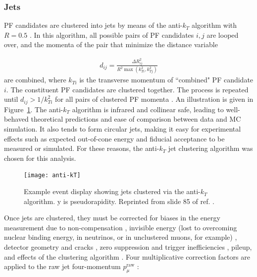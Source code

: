 \documentclass[dissertation.tex]{subfiles}
\begin{document}
\subsubsection{Jets}
\label{sec:Jets}

PF candidates are clustered into jets by means of the anti-$k_{T}$ algorithm with $R = 0.5$ \cite{AK5}.  In this algorithm, all possible pairs of PF candidates $i, j$ are looped over, and the momenta of the pair that minimize the distance variable

\begin{eqnarray}
d_{ij} = \frac{\Delta R_{ij}^{2}}{R^{2}\max(k_{Ti}^{2}, k_{Tj}^{2})}
\end{eqnarray}
%
are combined, where $k_{Ti}$ is the transverse momentum of ``combined" PF candidate $i$.  The constituent PF candidates are clustered together.  The process is repeated until $d_{ij} > 1/k_{Ti}^{2}$ for all pairs of clustered PF momenta \cite{Salam_talk}.  An illustration is given in Figure~\ref{fig:anti-kT}.  The anti-$k_{T}$ algorithm is infrared and collinear safe, leading to well-behaved theoretical predictions and ease of comparison between data and MC simulation.  It also tends to form circular jets, making it easy for experimental effects such as expected out-of-cone energy and fiducial acceptance to be measured or simulated.  For these reasons, the anti-$k_{T}$ jet clustering algorithm was chosen for this analysis.

\begin{figure}
	\centering
	\texttt{[image: anti-kT]}
	\caption{Example event display showing jets clustered via the anti-$k_{T}$ algorithm.  y is pseudorapidity.  Reprinted from slide 85 of ref. \cite{Salam_talk}.}
	\label{fig:anti-kT}
\end{figure}

Once jets are clustered, they must be corrected for biases in the energy measurement due to non-compensation \cite{Wigmans}, invisible energy (lost to overcoming nuclear binding energy, in neutrinos, or in unclustered muons, for example) \cite{Wigmans}, detector geometry and cracks \cite{CDF_JEC_website}, zero suppression and trigger inefficiencies \cite{CMS_MET_paper}, pileup, and effects of the clustering algorithm \cite{CDF_JEC_website}.  Four multiplicative correction factors are applied to the raw jet four-momentum $p_{\mu}^{\mathrm{raw}}$ \cite{CMS_JES_paper}:
\end{document}
